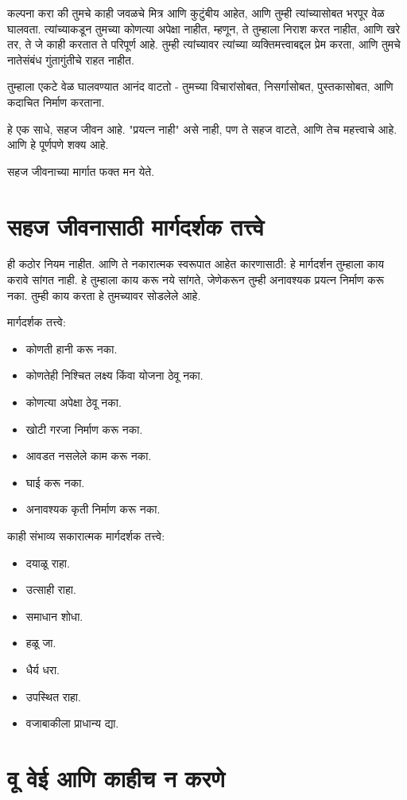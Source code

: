 कल्पना करा की तुमचे काही जवळचे मित्र आणि कुटुंबीय आहेत, आणि तुम्ही त्यांच्यासोबत भरपूर वेळ घालवता. त्यांच्याकडून तुमच्या कोणत्या अपेक्षा नाहीत, म्हणून, ते तुम्हाला निराश करत नाहीत, आणि खरे तर, ते जे काही करतात ते परिपूर्ण आहे. तुम्ही त्यांच्यावर त्यांच्या व्यक्तिमत्त्वाबद्दल प्रेम करता, आणि तुमचे नातेसंबंध गुंतागुंतीचे राहत नाहीत.

तुम्हाला एकटे वेळ घालवण्यात आनंद वाटतो - तुमच्या विचारांसोबत, निसर्गासोबत, पुस्तकासोबत, आणि कदाचित निर्माण करताना.

हे एक साधे, सहज जीवन आहे. "प्रयत्न नाही" असे नाही, पण ते सहज वाटते, आणि तेच महत्त्वाचे आहे. आणि हे पूर्णपणे शक्य आहे.

सहज जीवनाच्या मार्गात फक्त मन येते.

\chapter{सहज जीवनासाठी मार्गदर्शक तत्त्वे}

ही कठोर नियम नाहीत. आणि ते नकारात्मक स्वरूपात आहेत कारणासाठी: हे मार्गदर्शन तुम्हाला काय करावे सांगत नाही. हे तुम्हाला काय करू नये सांगते, जेणेकरून तुम्ही अनावश्यक प्रयत्न निर्माण करू नका. तुम्ही काय करता हे तुमच्यावर सोडलेले आहे.

मार्गदर्शक तत्त्वे:
\begin{itemize}
\item कोणती हानी करू नका.
\item कोणतेही निश्चित लक्ष्य किंवा योजना ठेवू नका.
\item कोणत्या अपेक्षा ठेवू नका.
\item खोटी गरजा निर्माण करू नका.
\item आवडत नसलेले काम करू नका.
\item घाई करू नका.
\item अनावश्यक कृती निर्माण करू नका.
\end{itemize}

काही संभाव्य सकारात्मक मार्गदर्शक तत्त्वे:
\begin{itemize}
\item दयाळू राहा.
\item उत्साही राहा.
\item समाधान शोधा.
\item हळू जा.
\item धैर्य धरा.
\item उपस्थित राहा.
\item वजाबाकीला प्राधान्य द्या.
\end{itemize}

\chapter{ वू वेई आणि काहीच न करणे}

